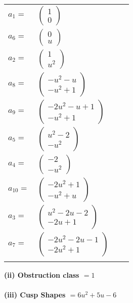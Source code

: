 \documentclass[1p]{elsarticle_modified}
\theoremstyle{definition}
\begin{document}
\begin{tabular}{m{7pt} m{180pt} m{7pt} m{180pt} }
\flushright $a_{1}=$&$\begin{pmatrix}1\\0\end{pmatrix}$ \\
\flushright $a_{6}=$&$\begin{pmatrix}0\\u\end{pmatrix}$ \\
\flushright $a_{2}=$&$\begin{pmatrix}1\\u^2\end{pmatrix}$ \\
\flushright $a_{8}=$&$\begin{pmatrix}- u^2- u\\- u^2+1\end{pmatrix}$ \\
\flushright $a_{9}=$&$\begin{pmatrix}-2 u^2- u+1\\- u^2+1\end{pmatrix}$ \\
\flushright $a_{5}=$&$\begin{pmatrix}u^2-2\\- u^2\end{pmatrix}$ \\
\flushright $a_{4}=$&$\begin{pmatrix}-2\\- u^2\end{pmatrix}$ \\
\flushright $a_{10}=$&$\begin{pmatrix}-2 u^2+1\\- u^2+u\end{pmatrix}$ \\
\flushright $a_{3}=$&$\begin{pmatrix}u^2-2 u-2\\-2 u+1\end{pmatrix}$ \\
\flushright $a_{7}=$&$\begin{pmatrix}-2 u^2-2 u-1\\-2 u^2+1\end{pmatrix}$\\&\end{tabular}
\flushleft \textbf{(ii) Obstruction class $= 1$}\\~\\
\flushleft \textbf{(iii) Cusp Shapes $= 6 u^2+5 u-6$}\\~\\
\end{document}
